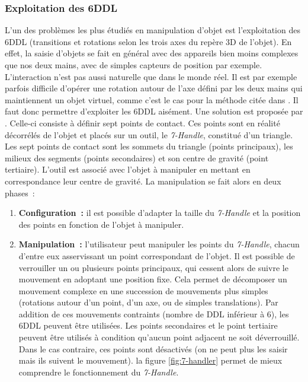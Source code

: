 \documentclass[11pt]{article}
\begin{document}
\subsubsection{Exploitation des 6DDL}
L'un des problèmes les plus étudiés en manipulation d'objet est l'exploitation des 6DDL (transitions et rotations selon les trois axes du repère 3D de l'objet). En effet, la saisie d'objets se fait en général avec des appareils bien moins complexes que nos deux mains, avec de simples capteurs de position par exemple. L'interaction n'est pas aussi naturelle que dans le monde réel. Il est par exemple parfois difficile d'opérer une rotation autour de l'axe défini par les deux mains qui maintiennent un objet virtuel, comme c'est le cas pour la méthode citée dans \cite{2-hands}. Il faut donc permettre d'exploiter les 6DDL aisément. Une solution est proposée par \cite{thesis}. Celle-ci consiste à définir sept points de contact. Ces points sont en réalité décorrélés de l'objet et placés sur un outil, le \textit{7-Handle}, constitué d'un triangle. Les sept points de contact sont les sommets du triangle (points principaux), les milieux des segments (points secondaires) et son centre de gravité (point tertiaire). L'outil est associé avec l'objet à manipuler en mettant en correspondance leur centre de gravité. La manipulation se fait alors en deux phases~:
\begin{enumerate}
	\item \textbf{Configuration~:} il est possible d'adapter la taille du \textit{7-Handle} et la position des points en fonction de l'objet à manipuler.
	\item \textbf{Manipulation~:} l'utilisateur peut manipuler les points du \textit{7-Handle}, chacun d'entre eux asservissant un point correspondant de l'objet. Il est possible de verrouiller un ou plusieurs points principaux, qui cessent alors de suivre le mouvement en adoptant une position fixe. Cela permet de décomposer un mouvement complexe en une succession de mouvements plus simples (rotations autour d'un point, d'un axe, ou de simples translations). Par addition de ces mouvements contraints (nombre de DDL inférieur à 6), les 6DDL peuvent être utilisées. Les points secondaires et le point tertiaire peuvent être utilisés à condition qu'aucun point adjacent ne soit déverrouillé. Dans le cas contraire, ces points sont désactivés (on ne peut plus les saisir mais ils suivent le mouvement). la figure \ref{fig:7-handler} permet de mieux comprendre le fonctionnement du \textit{7-Handle}.
\end{enumerate}
\end{document}
